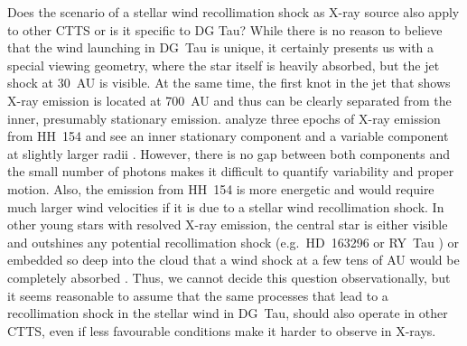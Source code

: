 Does the scenario of a stellar wind recollimation shock as X-ray source also apply to other CTTS or is it specific to DG Tau? While there is no reason to believe that the wind launching in DG~Tau is unique, it certainly presents us with a special viewing geometry, where the star itself is heavily absorbed, but the jet shock at 30~AU is visible. At the same time, the first knot in the jet that shows X-ray emission is located at 700~AU and thus can be clearly separated from the inner, presumably stationary emission. \citet{2011A&A...530A.123S} analyze three epochs of X-ray emission from HH~154 and see an inner stationary component and a variable component at slightly larger radii \textbf{\citep[see also][]{2011ApJ...737...54B}}. However, there is no gap between both components and the small number of photons makes it difficult to quantify variability and proper motion. Also, the emission from HH~154 is more energetic and would require much larger wind velocities if it is due to a stellar wind recollimation shock. In other young stars with resolved X-ray emission, the central star is either visible and outshines any potential recollimation shock (e.g.\ HD~163296 \citep{2005ApJ...628..811S,2013A&A...552A.142G} or RY~Tau \citep{2014ApJ...788..101S}) or embedded so deep into the cloud that a wind shock at a few tens of AU would be completely absorbed \citep[e.g.\ HH80/81][]{2004ApJ...605..259P}. Thus, we cannot decide this question observationally, but it seems reasonable to assume that the same processes that lead to a recollimation shock in the stellar wind in DG~Tau, should also operate in other CTTS, even if less favourable conditions make it harder to observe in X-rays.

